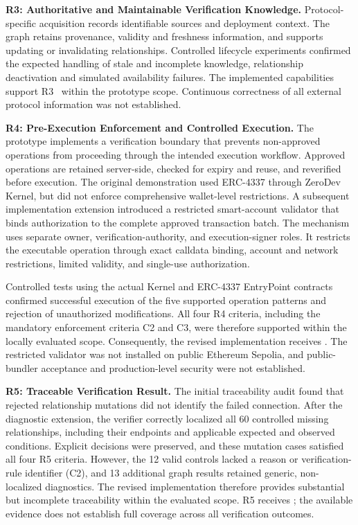 \medskip\noindent\textbf{R3: Authoritative and Maintainable Verification Knowledge.}
Protocol-specific acquisition records identifiable sources and deployment
context. The graph retains provenance, validity and freshness information,
and supports updating or invalidating relationships. Controlled lifecycle
experiments confirmed the expected handling of stale and incomplete knowledge,
relationship deactivation and simulated availability failures. The implemented
capabilities support R3 \evThree\ within the prototype scope. Continuous
correctness of all external protocol information was not established.



\noindent\textbf{R4: Pre-Execution Enforcement and Controlled Execution.}
The prototype implements a verification boundary that prevents
non-approved operations from proceeding through the intended
execution workflow. Approved operations are retained server-side,
checked for expiry and reuse, and reverified before execution.
The original demonstration used ERC-4337 through ZeroDev Kernel,
but did not enforce comprehensive wallet-level restrictions. A subsequent implementation extension introduced a restricted
smart-account validator that binds authorization to the complete
approved transaction batch. The mechanism uses separate owner,
verification-authority, and execution-signer roles. It restricts
the executable operation through exact calldata binding,
account and network restrictions, limited validity, and
single-use authorization.

Controlled tests using the actual Kernel and ERC-4337 EntryPoint
contracts confirmed successful execution of the five supported
operation patterns and rejection of unauthorized modifications.
All four R4 criteria, including the mandatory enforcement
criteria C2 and C3, were therefore supported within the locally
evaluated scope. Consequently, the revised implementation
receives \evThree{}. The restricted validator was not installed on public Ethereum
Sepolia, and public-bundler acceptance and production-level
security were not established.




\medskip\noindent\textbf{R5: Traceable Verification Result.}
The initial traceability audit found that rejected relationship
mutations did not identify the failed connection. After the diagnostic
extension, the verifier correctly localized all 60 controlled missing
relationships, including their endpoints and applicable expected and
observed conditions. Explicit decisions were preserved, and these
mutation cases satisfied all four R5 criteria. However, the 12 valid
controls lacked a reason or verification-rule identifier (C2), and
13 additional graph results retained generic, non-localized diagnostics.
The revised implementation therefore provides substantial but
incomplete traceability within the evaluated scope. R5 receives \evTwo;
the available evidence does not establish full coverage across all
verification outcomes.



